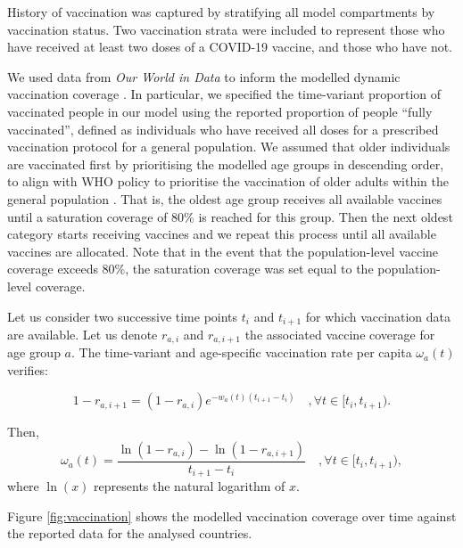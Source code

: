 
History of vaccination was captured by stratifying all model compartments by vaccination status.
Two vaccination strata were included to represent those who have received at least two doses of a COVID-19 vaccine,
and those who have not.

We used data from \textit{Our World in Data} to inform the modelled dynamic vaccination coverage \cite{mathieu2021}. In particular, we specified the time-variant proportion of vaccinated people 
in our model using the reported proportion of people ``fully vaccinated'', defined as individuals who have received all doses for a prescribed vaccination protocol for a general population. We assumed that older individuals are vaccinated 
first by prioritising the modelled age groups in descending order, to align with WHO policy to prioritise the vaccination of older adults within the general population \cite{whovax2020}. That is, the oldest age group receives all available vaccines until a 
saturation coverage of 80\% is reached for this group. Then the next oldest category starts receiving vaccines and we repeat this process until all available vaccines
are allocated. Note that in the event that the population-level vaccine coverage exceeds 80\%, the saturation coverage was set equal to the population-level coverage. 

Let us consider two successive time points $t_i$ and $t_{i+1}$ for which vaccination data are available. Let us denote $r_{a, i}$ and $r_{a, i+1}$ the associated vaccine 
coverage for age group $a$. The time-variant and age-specific vaccination rate per capita $\omega_a(t)$ verifies:

\begin{equation}
    1 - r_{a, i+1} = (1 - r_{a, i})e^{-w_a(t)(t_{i+1} - t_i)} \quad, \forall t \in [t_i, t_{i+1}) .
\end{equation}

Then, 
\begin{equation}
    \label{eq:vacc}
    \omega_a(t) = \frac{\ln(1 - r_{a, i}) - \ln(1 - r_{a, i+1})}{t_{i+1} - t_i} \quad, \forall t \in [t_i, t_{i+1}) ,
\end{equation}
where $\ln(x)$ represents the natural logarithm of $x$.

Figure \ref{fig:vaccination} shows the modelled vaccination coverage over time against the reported data for the analysed countries.


